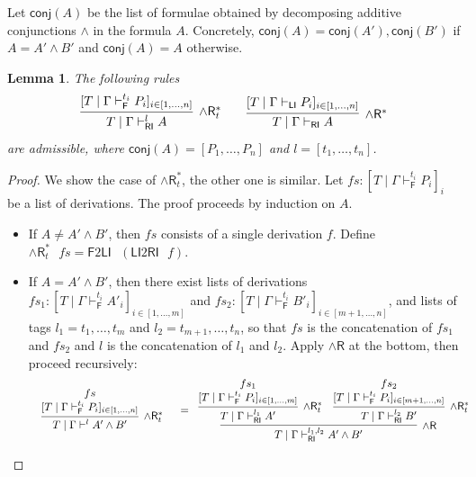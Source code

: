 \documentclass[submission,copyright,creativecommons]{eptcs}
\newtheorem{lemma}[theorem]{Lemma}
\theoremstyle{definition}
\newcommand{\andr}{\land \mathsf{R}}
\newcommand{\RI}{\mathsf{RI}}
\newcommand{\LI}{\mathsf{LI}}
\newcommand{\F}{\mathsf{F}}
\newcommand{\conj}[1]{\mathsf{conj} (#1)}
\newcommand{\proofbox}[1]{\begin{tabular}{l} #1 \end{tabular}}
\begin{document}
  Let $\conj{A}$ be the list of formulae obtained by decomposing additive conjunctions $\land$ in the formula $A$. Concretely, $\conj{A} = \conj{A'} , \conj{B'}$ if $A = A' \land B'$ and $\conj{A} = A$ otherwise.
\begin{lemma}\label{lem:BigStep}
  The following rules
  \begin{displaymath}
    \infer[\andr^{*}_t]{T \mid \Gamma \vdash^{l}_{\RI} A}{
      [T \mid \Gamma \vdash^{t_i}_{\F} P_i]_{i \in [1 , \dots , n]}
    }
    \qquad
    \infer[\andr^{*}]{T \mid \Gamma \vdash_{\RI} A}{
      [T \mid \Gamma \vdash_{\LI} P_i]_{i \in [1 , \dots , n]}
    }
  \end{displaymath}
  are admissible, where $\conj{A} = [P_1 , \dots , P_n]$ and $l = [t_1 , \dots , t_n]$.
\end{lemma}
\begin{proof}
  We show the case of $\andr^{*}_{t}$, the other one is similar.
  Let $fs : [T \mid \Gamma \vdash^{t_i}_{\F} P_i]_i$ be a list of derivations. The proof proceeds by induction on $A$.
  \begin{itemize}
    \item If $A \neq A' \land B'$, then $fs$ consists of a single derivation $f$. Define $\andr^*_{t} \text{ } fs = \F 2 \LI \text{ } (\LI 2 \RI \text{ } f)$.
    \item If $A = A' \land B'$, then there exist lists of derivations $fs_1 : [T \mid \Gamma \vdash^{t_i}_{\F} A'_i]_{i \in [1 , \dots , m]}$ and \linebreak 
    $fs_2 : [T \mid \Gamma \vdash^{t_i}_{\F} B'_i]_{i \in [m+1 , \dots , n]}$, and lists of tags $l_1 = t_1 , \dots , t_m$ and $l_2 = t_{m+1} , \dots , t_n$, so that $fs$ is the concatenation of $fs_1$ and $fs_2$ and $l$ is the concatenation of $l_1 $ and $l_2$.
    Apply $\andr$ at the bottom, then proceed recursively:
    \begin{displaymath}
      \begin{array}{cc}
        \proofbox{
        \infer[\andr^*_{t}]{T \mid \Gamma \vdash^{l} A' \land B'}{
          \deduce{[T \mid \Gamma \vdash^{t_i}_{\F} P_i]_{i \in [1 , \dots , n]}}{fs}
        }
        }
        &
        =
        \proofbox{
        \infer[\andr]{T \mid \Gamma \vdash^{l_1 , l_2}_{\RI} A' \land B'}{
          \infer[\andr^{*}_{t}]{T \mid \Gamma \vdash^{l_1}_{\RI} A'}{
            \deduce{[T \mid \Gamma \vdash^{t_i}_{\F} P_i]_{i \in [1 , \dots , m]}}{fs_1}
          }
          &
          \infer[\andr^{*}_{t}]{T \mid \Gamma \vdash^{l_2}_{\RI} B'}{
            \deduce{[T \mid \Gamma \vdash^{t_i}_{\F} P_i]_{i \in [m+1 , \dots , n]}}{fs_2}
          }
        }
       }
      \end{array}
    \end{displaymath}
  \end{itemize}
\end{proof}
\end{document}

